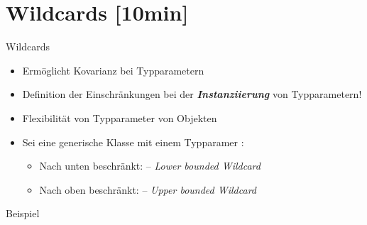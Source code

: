 \documentclass{../tuda-beamer}
\begin{document}
    \begin{frame}[c]
        
        
    \end{frame}


    \section{Wildcards [10min]}
    \label{sec:wildcards}
    \begin{frame}[c]{Wildcards}
        \begin{itemize}
            \item Ermöglicht Kovarianz bei Typparametern
            \item Definition der Einschränkungen bei der \textbf{\emph{Instanziierung}} von
            Typparametern!
            \item Flexibilität von Typparameter von Objekten
            \item Sei  eine generische Klasse mit einem Typparamer :
            \begin{itemize}
                \item Nach unten beschränkt: \underline{}\inlinejava{>} -- \emph{Lower bounded Wildcard}
                \item Nach oben beschränkt: \underline{}\inlinejava{>} -- \emph{Upper bounded Wildcard}
            \end{itemize}
        \end{itemize}
    \end{frame}

    \begin{frame}[c]{Beispiel}
        
    \end{frame}
\end{document}
